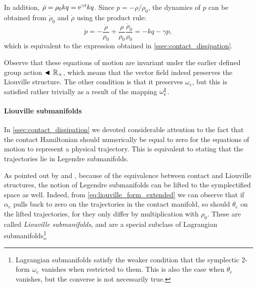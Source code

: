 In addition, \(\dot{\rho} = \rho_0 kq = \mathrm{e}^{\gamma t} kq\). Since \(p = -\rho/\rho_0\), the dynamics of \(p\) can be obtained from  \(\dot{\rho}_0\) and \(\dot{\rho}\) using the product rule:
\begin{equation} 
    \dot{p} = -\frac{\dot{\rho}}{\rho_0} + \frac{\rho}{\rho_0}\frac{\dot{\rho}_0}{\rho_0} = -kq - \gamma p,
    \label{eq:pdot}
\end{equation}
which is equivalent to the expression obtained in \cref{ssec:contact_dissipation}.

Observe that these equations of motion are invariant under the earlier defined group action \(\blacktriangleleft\,\mathbb{R}_{\times}\), which means that the vector field indeed preserves the Liouville structure. The other condition is that it preserves \(\omega_e\), but this is satisfied rather trivially as a result of the mapping \(\omega_e^\sharp\).

\paragraph{Liouville submanifolds} In \cref{ssec:contact_dissipation} we devoted considerable attention to the fact that the contact Hamiltonian should numerically be equal to zero for the equations of motion to represent a physical trajectory. This is equivalent to stating that the trajectories lie in Legendre submanifolds.

As pointed out by \citet{VanderSchaft2021a} and \citet{Libermann1987}, because of the equivalence between contact and Liouville structures, the notion of Legendre submanifolds can be lifted to the symplectified space as well. Indeed, from \cref{eq:liouville_form_extended} we can observe that if \(\alpha_e\) pulls back to zero on the trajectories in the contact manifold, so should \(\theta_e\) on the lifted trajectories, for they only differ by multiplication with \(\rho_0\). These are called \emph{Liouville submanifolds}, and are a special subclass of Lagrangian submanifolds\footnote{Lagrangian submanifolds satisfy the weaker condition that the symplectic 2-form \(\omega_e\) vanishes when restricted to them. This is also the case when \(\theta_e\) vanishes, but the converse is not necessarily true.}

